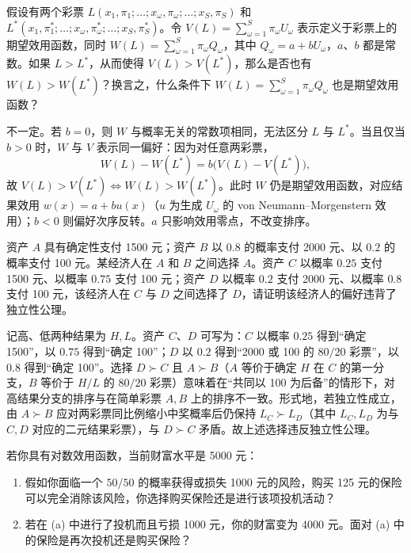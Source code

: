 \begin{problem}
 假设有两个彩票 $L(x_1,\pi_1;\ldots;x_\omega,\pi_\omega;\ldots;x_S,\pi_S)$ 和 $L^*(x_1,\pi_1^*;\ldots;x_\omega,\pi_\omega^*;\ldots;x_S,\pi_S^*)$。令 $V(L)=\sum_{\omega=1}^{S}\pi_\omega U_\omega$ 表示定义于彩票上的期望效用函数，同时 $W(L)=\sum_{\omega=1}^{S}\pi_\omega Q_\omega$，其中 $Q_\omega=a+bU_\omega$，$a$、$b$ 都是常数。如果 $L>L^*$，从而使得 $V(L)>V(L^*)$，那么是否也有 $W(L)>W(L^*)$？换言之，什么条件下 $W(L)=\sum_{\omega=1}^{S}\pi_\omega Q_\omega$ 也是期望效用函数？
\end{problem}
\begin{solution}
不一定。若 $b=0$，则 $W$ 与概率无关的常数项相同，无法区分 $L$ 与 $L^*$。当且仅当 $b>0$ 时，$W$ 与 $V$ 表示同一偏好：因为对任意两彩票，
\[
W(L)-W(L^*)=b\bigl(V(L)-V(L^*)\bigr),
\]
故 $V(L)>V(L^*)\Leftrightarrow W(L)>W(L^*)$。此时 $W$ 仍是期望效用函数，对应结果效用 $w(x)=a+bu(x)$（$u$ 为生成 $U_\omega$ 的 von Neumann--Morgenstern 效用）；$b<0$ 则偏好次序反转。$a$ 只影响效用零点，不改变排序。
\end{solution}
\begin{problem}
 资产 $A$ 具有确定性支付 \num{1500} 元；资产 $B$ 以 $0.8$ 的概率支付 \num{2000} 元、以 $0.2$ 的概率支付 \num{100} 元。某经济人在 $A$ 和 $B$ 之间选择 $A$。资产 $C$ 以概率 $0.25$ 支付 \num{1500} 元、以概率 $0.75$ 支付 \num{100} 元；资产 $D$ 以概率 $0.2$ 支付 \num{2000} 元、以概率 $0.8$ 支付 \num{100} 元，该经济人在 $C$ 与 $D$ 之间选择了 $D$，请证明该经济人的偏好违背了独立性公理。
\end{problem}
\begin{solution}
记高、低两种结果为 $H,L$。资产 $C$、$D$ 可写为：$C$ 以概率 $0.25$ 得到“确定 \num{1500}”，以 $0.75$ 得到“确定 \num{100}”；$D$ 以 $0.2$ 得到“\num{2000} 或 \num{100} 的 $80/20$ 彩票”，以 $0.8$ 得到“确定 \num{100}”。选择 $D\succ C$ 且 $A\succ B$（$A$ 等价于确定 $H$ 在 $C$ 的第一分支，$B$ 等价于 $H/L$ 的 $80/20$ 彩票）意味着在“共同以 \num{100} 为后备”的情形下，对高结果分支的排序与在简单彩票 $A,B$ 上的排序不一致。形式地，若独立性成立，由 $A\succ B$ 应对两彩票同比例缩小中奖概率后仍保持 $L_C\succ L_D$（其中 $L_C,L_D$ 为与 $C,D$ 对应的二元结果彩票），与 $D\succ C$ 矛盾。故上述选择违反独立性公理。
\end{solution}
\begin{problem}
 若你具有对数效用函数，当前财富水平是 \num{5000} 元：
\begin{enumerate}[label=(\alph*)]
    \item 假如你面临一个 $50/50$ 的概率获得或损失 \num{1000} 元的风险，购买 \num{125} 元的保险可以完全消除该风险，你选择购买保险还是进行该项投机活动？
    \item 若在 (a) 中进行了投机而且亏损 \num{1000} 元，你的财富变为 \num{4000} 元。面对 (a) 中的保险是再次投机还是购买保险？
\end{enumerate}
\end{problem}
